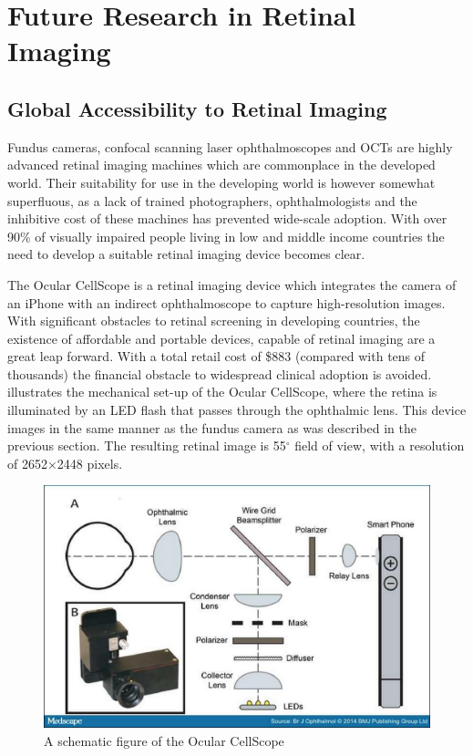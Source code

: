 
\chapter{Future Research in Retinal Imaging}

\label{future_research}


\section {Global Accessibility to Retinal Imaging}


Fundus cameras, confocal scanning laser ophthalmoscopes and OCTs are
highly advanced retinal imaging machines which are commonplace in the
developed world. Their suitability for use in the developing world is
however somewhat superfluous, as a lack of trained photographers,
ophthalmologists and the inhibitive cost of these machines has prevented
wide-scale adoption. With over 90\% of visually impaired people living
in low and middle income countries the need to develop a suitable
retinal imaging device becomes clear.\cite{burgess2013diabetic}

The Ocular CellScope is a retinal imaging device which integrates the
camera of an iPhone with an indirect ophthalmoscope to capture
high-resolution images. With significant obstacles to retinal screening
in developing countries, the existence of affordable and portable devices,
capable of retinal imaging are a great leap forward. With a total retail
cost of \$883 (compared with tens of thousands) the financial obstacle
to widespread clinical adoption is avoided.  illustrates
the mechanical set-up of the Ocular CellScope, where the retina is
illuminated by an LED flash that passes through the ophthalmic lens.
This device images in the same manner as the fundus camera as was described
in the previous section. The resulting retinal image is 55$^\circ$ field of
view, with a resolution of 2652×2448 pixels. \cite{medscape}

\begin{figure}[htbp]
\centering
 \includegraphics{figures/ocular}
\caption{A schematic figure of the Ocular CellScope \cite{medscape} }
\label{fig:ocular}
\end{figure}


